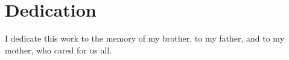 {\centering \section*{Dedication}}

I dedicate this work to the memory of my brother, to my father, and to my mother, who cared for us all.
